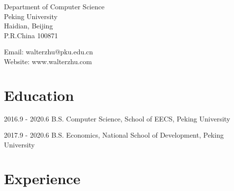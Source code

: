 \documentclass{academiccv}
\begin{document}
\raggedright


\vspace{1em}
\begin{minipage}[t]{0.495\textwidth}
  Department of Computer Science \\
 Peking University\\
  Haidian, Beijing\\
  P.R.China 100871
\end{minipage}
\begin{minipage}[t]{0.495\textwidth}
  Email: walterzhu@pku.edu.cn \\
  Website: www.walterzhu.com \\
\end{minipage}
\vspace{0.5em}


\section*{Education}

\begin{tablist}

\item[2016.9 - 2020.6]  \tab B.S. Computer Science, School of EECS, Peking University
\item[2017.9 - 2020.6]  \tab B.S. Economics, National School of Development, Peking University

\end{tablist}


\section*{Experience}
\end{document}
